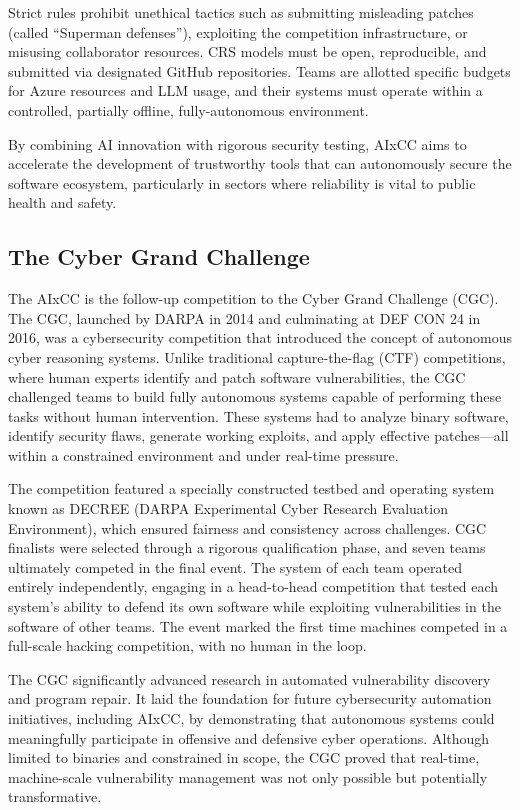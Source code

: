 Strict rules prohibit unethical tactics such as submitting misleading patches (called ``Superman defenses''), exploiting the competition infrastructure, or misusing collaborator resources. 
CRS models must be open, reproducible, and submitted via designated GitHub repositories. 
Teams are allotted specific budgets for Azure resources and LLM usage, and their systems must operate within a controlled, partially offline, fully-autonomous environment.

By combining AI innovation with rigorous security testing, AIxCC aims to accelerate the development of trustworthy tools that can autonomously secure the software ecosystem, particularly in sectors where reliability is vital to public health and safety.

\subsection{The Cyber Grand Challenge}

The AIxCC is the follow-up competition to the Cyber Grand Challenge (CGC).
The CGC, launched by DARPA in 2014 and culminating at DEF CON 24 in 2016, was a cybersecurity competition that introduced the concept of autonomous cyber reasoning systems. 
Unlike traditional capture-the-flag (CTF) competitions, where human experts identify and patch software vulnerabilities, the CGC challenged teams to build fully autonomous systems capable of performing these tasks without human intervention. 
These systems had to analyze binary software, identify security flaws, generate working exploits, and apply effective patches—all within a constrained environment and under real-time pressure.

The competition featured a specially constructed testbed and operating system known as DECREE (DARPA Experimental Cyber Research Evaluation Environment), which ensured fairness and consistency across challenges. 
CGC finalists were selected through a rigorous qualification phase, and seven teams ultimately competed in the final event. 
The system of each team operated entirely independently, engaging in a head-to-head competition that tested each system’s ability to defend its own software while exploiting vulnerabilities in the software of other teams. 
The event marked the first time machines competed in a full-scale hacking competition, with no human in the loop.

The CGC significantly advanced research in automated vulnerability discovery and program repair. 
It laid the foundation for future cybersecurity automation initiatives, including AIxCC, by demonstrating that autonomous systems could meaningfully participate in offensive and defensive cyber operations. 
Although limited to binaries and constrained in scope, the CGC proved that real-time, machine-scale vulnerability management was not only possible but potentially transformative. 

